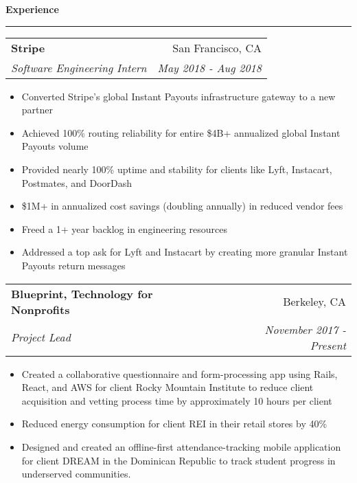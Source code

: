 \documentclass[11pt,letterpaper]{article}
\makeatletter
\newenvironment{topic}[1]
    {
    {\Large \centerline{#1}}
    \vspace*{0.03in}
    \hrule 
    \vspace*{0.05in}
    }
    {}
\newenvironment{event}
    {
    \begin{tabular*}{\textwidth}{l@{\extracolsep{\fill}}r}
    }
    {
    \end{tabular*}
    }
\makeatother
\begin{document}
    \begin{topic}{\textbf{Experience}}
        \begin{event}
            \textbf{Stripe} & San Francisco, CA \\
            \emph{Software Engineering Intern} & \emph{May 2018 - Aug 2018} \\
        \end{event}
            \begin{itemize}
                \item Converted Stripe's global Instant Payouts infrastructure gateway to a new partner
                \setlength{\itemindent}{0.21in}
                \item Achieved 100\% routing reliability for entire \$4B+ annualized global Instant Payouts volume
                \item Provided nearly 100\% uptime and stability for clients like Lyft, Instacart, Postmates, and DoorDash
                \item \$1M+ in annualized cost savings (doubling annually) in reduced vendor fees
                \item Freed a 1+ year backlog in engineering resources
                \setlength{\itemindent}{0in}
                \item Addressed a top ask for Lyft and Instacart by creating more granular Instant Payouts return messages
            \end{itemize}

        \begin{event}
            \textbf{Blueprint, Technology for Nonprofits} & Berkeley, CA \\
            \emph{Project Lead} & \emph{November 2017 - Present}
        \end{event}
            \begin{itemize}
                \item Created a collaborative questionnaire and form-processing app using Rails, React, and AWS for client Rocky Mountain Institute to reduce client acquisition and vetting process time by approximately 10 hours per client
                \item Reduced energy consumption for client REI in their retail stores by 40\% 
                \item Designed and created an offline-first attendance-tracking mobile application for client DREAM in the Dominican Republic to track student progress in underserved communities.
            \end{itemize}


\end{topic}
\end{document}
